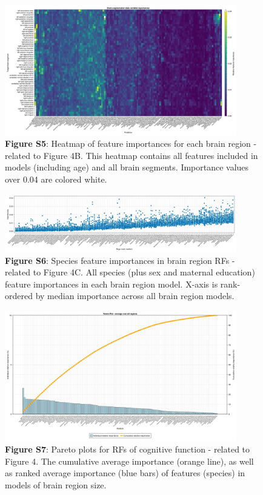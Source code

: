 \documentclass{article}
\begin{document}
\begin{figure}[h]
  \centering
  \includegraphics[width=0.9\textwidth]{assets/Supp_Figure5.png}
  \captionsetup{labelformat=empty}
  \caption{
      \textbf{Figure S5}: Heatmap of feature importances for each brain region -
      related to Figure 4B. This heatmap contains all features included in models
      (including age) and all brain segments. Importance values over 0.04
      are colored white.
  }
\end{figure}

\begin{figure}
  \centering
  \includegraphics[width=0.9\textwidth]{assets/Supp_Figure6.png}
  \captionsetup{labelformat=empty}
  \caption{
      \textbf{Figure S6}: Species feature importances in brain region RFs - related to Figure 4C.
      All species (plus sex and maternal education) feature importances in each brain region model.
      X-axis is rank-ordered by median importance across all brain region models.
  }
\end{figure}

\begin{figure}[h]
  \centering
  \includegraphics[width=0.9\textwidth]{assets/Supp_Figure7.png}
  \captionsetup{labelformat=empty}
  \caption{
      \textbf{Figure S7}: Pareto plots for RFs of cognitive function - related to Figure 4.
      The cumulative average importance (orange line), as well as ranked average importance (blue bars)
      of features (species) in models of brain region size.
  }
\end{figure}
\end{document}
